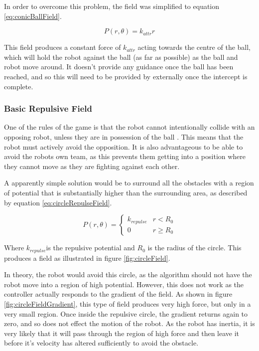 \documentclass[10pt]{article}
\begin{document}
In order to overcome this problem, the field was simplified to equation
\ref{eq:conicBallField}.

\begin{equation}
P(r,\theta)=k_{attr}r\label{eq:conicBallField}
\end{equation}

This field produces a constant force of $k_{attr}$ acting towards the centre of
the ball, which will hold the robot against the ball (as far as possible) as the
ball and robot move around. It doesn't provide any guidance once the ball has
been reached, and so this will need to be provided by externally once
the intercept is complete.

\subsubsection{Basic Repulsive Field\label{sub:Basic-Repulsive-Field}}

One of the rules of the game is that the robot cannot intentionally collide with
an opposing robot, unless they are in possession of the ball
\cite{simurosotSim}. This means that the robot must actively avoid the
opposition. It is also advantageous to be able to avoid the robots own team, as
this prevents them getting into a position where they cannot move as they are
fighting against each other.

A apparently simple solution would be to surround all the obstacles with a
region of potential that is substantially higher than the surrounding area, as
described by equation \ref{eq:circleRepulseField}.

\begin{equation}
P\left(r,\theta\right)=\begin{cases}
k_{repulse} & r<R_{0}\\
0 & r\geq R_{0}
\end{cases}\label{eq:circleRepulseField}
\end{equation}

Where $k_{repulse}$is the repulsive potential and $R_{0}$ is the radius of the
circle. This produces a field as illustrated in figure \ref{fig:circleField}.

In theory, the robot would avoid this circle, as the algorithm should not have
the robot move into a region of high potential. However, this does not work as
the controller actually responds to the gradient of the field. As shown in
figure \ref{fig:circleFieldGradient}, this type of field produces very high
force, but only in a very small region. Once inside the repulsive circle, the
gradient returns again to zero, and so does not effect the motion of the robot.
As the robot has inertia, it is very likely that it will pass through the region
of high force and then leave it before it's velocity has altered sufficiently to
avoid the obstacle.
\end{document}
